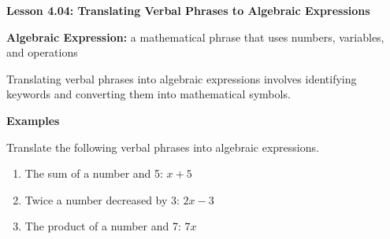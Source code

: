 \begin{center}
\textbf{Lesson 4.04: Translating Verbal Phrases to Algebraic Expressions}
\end{center}

\vspace*{-1.5ex}

\noindent \textbf{Algebraic Expression:} a mathematical phrase that uses numbers, variables, and operations

\noindent Translating verbal phrases into algebraic expressions involves identifying keywords and converting them into mathematical symbols.

\noindent\textbf{Examples}

Translate the following verbal phrases into algebraic expressions.

\begin{enumerate}
    \item The sum of a number and 5: \(x + 5\)  
    \item Twice a number decreased by 3: \(2x - 3\)  
    \item The product of a number and 7: \(7x\)  
\end{enumerate}
